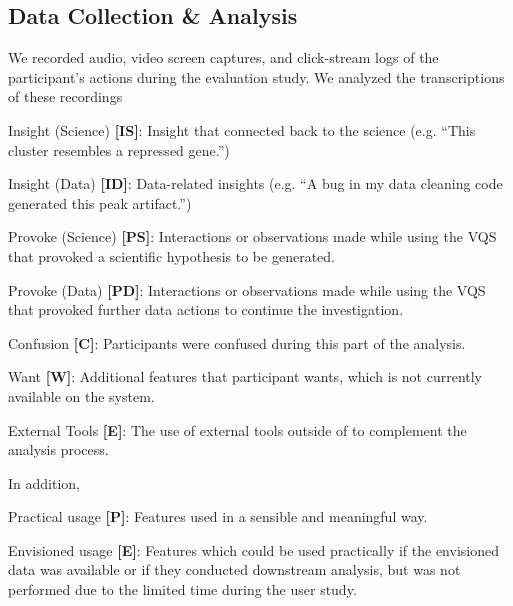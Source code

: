 \subsection{Data Collection \& Analysis}
We recorded audio, video screen captures, and click-stream logs of the participant's actions during the evaluation study. We analyzed the transcriptions of these recordings  
\begin{denselist}
    \item Insight (Science) \textbf{[IS]}: Insight that connected back to the science (e.g. ``This cluster resembles a repressed gene.'')
    \item Insight (Data) \textbf{[ID]}: Data-related insights (e.g. ``A bug in my data cleaning code generated this peak artifact.'')
    \item Provoke (Science) \textbf{[PS]}: Interactions or observations made while using the VQS that provoked a scientific hypothesis to be generated.
    \item Provoke (Data) \textbf{[PD]}: Interactions or observations made while using the VQS that provoked further data actions to continue the investigation.
    \item Confusion \textbf{[C]}: Participants were confused during this part of the analysis.
    \item Want \textbf{[W]}: Additional features that participant wants, which is not currently available on the system.
    \item External Tools \textbf{[E]}: The use of external tools outside of \zv to complement the analysis process.
\end{denselist}
\noindent \par In addition,  
\begin{denselist}
    \item Practical usage \textbf{[P]}: Features used in a sensible and meaningful way.
    \item Envisioned usage \textbf{[E]}: Features which could be used practically if the envisioned data was available or if they conducted downstream analysis, but was not performed due to the limited time during the user study. 
    \item {}
\end{denselist}

